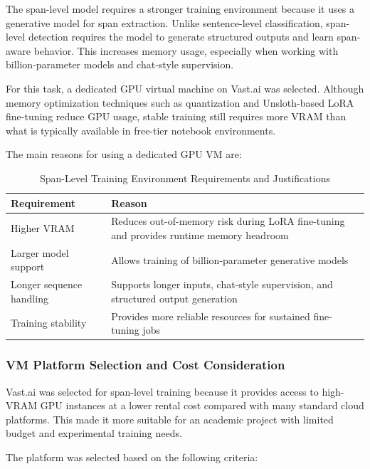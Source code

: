 \documentclass[12pt,oneside,openright,a4paper]{cpe-english-project}
\begin{document}
The span-level model requires a stronger training environment because it uses a generative model for span extraction. Unlike sentence-level classification, span-level detection requires the model to generate structured outputs and learn span-aware behavior. This increases memory usage, especially when working with billion-parameter models and chat-style supervision.

For this task, a dedicated GPU virtual machine on Vast.ai was selected. Although memory optimization techniques such as quantization and Unsloth-based LoRA fine-tuning reduce GPU usage, stable training still requires more VRAM than what is typically available in free-tier notebook environments.

The main reasons for using a dedicated GPU VM are:

\begin{table}[H]
\centering
\small
\caption{Span-Level Training Environment Requirements and Justifications}
\begin{tabularx}{\textwidth}{@{}>{\raggedright\arraybackslash}p{}>{\raggedright\arraybackslash}X@{}}
\toprule
\textbf{Requirement} & \textbf{Reason} \\
\midrule
Higher VRAM & Reduces out-of-memory risk during LoRA fine-tuning and provides runtime memory headroom \\
Larger model support & Allows training of billion-parameter generative models \\
Longer sequence handling & Supports longer inputs, chat-style supervision, and structured output generation \\
Training stability & Provides more reliable resources for sustained fine-tuning jobs \\
\bottomrule
\end{tabularx}
\end{table}

\subsubsection{VM Platform Selection and Cost Consideration}

Vast.ai was selected for span-level training because it provides access to high-VRAM GPU instances at a lower rental cost compared with many standard cloud platforms. This made it more suitable for an academic project with limited budget and experimental training needs.

The platform was selected based on the following criteria:
\end{document}
